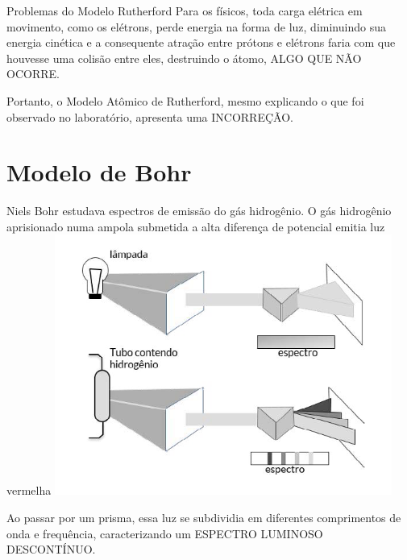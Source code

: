 \documentclass[10pt]{scrartcl}
\begin{document}
\begin{Box2}{Problemas do Modelo Rutherford}
Para os físicos, toda carga elétrica em movimento, como  os  elétrons,  perde  energia  na  forma  de  luz,  diminuindo  sua  energia  cinética  e  a  consequente  atração  entre  prótons  e  elétrons  faria  com  que  houvesse  uma  colisão  entre  eles,  destruindo  o  átomo, ALGO QUE NÃO OCORRE.

Portanto, o Modelo Atômico de Rutherford, mesmo explicando o que foi observado no laboratório, apresenta uma INCORREÇÃO.
\end{Box2}

\section{Modelo de Bohr}
\label{sec:org4299274}

Niels Bohr estudava espectros de emissão do gás hidrogênio. O gás hidrogênio aprisionado numa ampola  submetida  a  alta  diferença  de  potencial  emitia luz vermelha
\includegraphics[scale=.5]{./Quimica-Geral-Aula/lamp.png}

Ao passar por um prisma, essa luz se subdividia em diferentes  comprimentos  de  onda  e  frequência,  caracterizando  um  ESPECTRO  LUMINOSO  DESCONTÍNUO.
\end{document}
